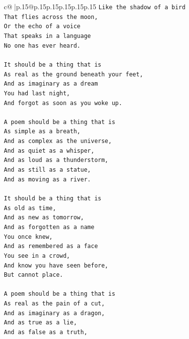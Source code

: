 \documentclass{article}
\begin{document}
{\begin{supertabular}{c@{$\;$}|p{.15\linewidth}@{}p{.15\linewidth}p{.15\linewidth}p{.15\linewidth}p{.15\linewidth}p{.15\linewidth}}
{{{\texttt{Like the shadow of a bird} \\
\texttt{That flies across the moon,} \\
\texttt{Or the echo of a voice} \\
\texttt{That speaks in a language} \\
\texttt{No one has ever heard.} \\
\\ 
\texttt{It should be a thing that is} \\
\texttt{As real as the ground beneath your feet,} \\
\texttt{And as imaginary as a dream} \\
\texttt{You had last night,} \\
\texttt{And forgot as soon as you woke up.} \\
\\ 
\texttt{A poem should be a thing that is} \\
\texttt{As simple as a breath,} \\
\texttt{And as complex as the universe,} \\
\texttt{And as quiet as a whisper,} \\
\texttt{And as loud as a thunderstorm,} \\
\texttt{And as still as a statue,} \\
\texttt{And as moving as a river.} \\
\\ 
\texttt{It should be a thing that is} \\
\texttt{As old as time,} \\
\texttt{And as new as tomorrow,} \\
\texttt{And as forgotten as a name} \\
\texttt{You once knew,} \\
\texttt{And as remembered as a face} \\
\texttt{You see in a crowd,} \\
\texttt{And know you have seen before,} \\
\texttt{But cannot place.} \\
\\ 
\texttt{A poem should be a thing that is} \\
\texttt{As real as the pain of a cut,} \\
\texttt{And as imaginary as a dragon,} \\
\texttt{And as true as a lie,} \\
\texttt{And as false as a truth,} \\
}}}
\end{supertabular}}
\end{document}
